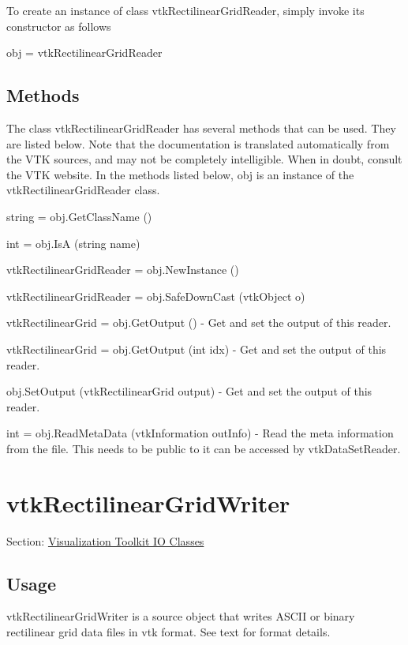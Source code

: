 To create an instance of class vtk\-Rectilinear\-Grid\-Reader, simply invoke its constructor as follows \begin{DoxyVerb}  obj = vtkRectilinearGridReader
\end{DoxyVerb}
 \hypertarget{vtkwidgets_vtkxyplotwidget_Methods}{}\subsection{Methods}\label{vtkwidgets_vtkxyplotwidget_Methods}
The class vtk\-Rectilinear\-Grid\-Reader has several methods that can be used. They are listed below. Note that the documentation is translated automatically from the V\-T\-K sources, and may not be completely intelligible. When in doubt, consult the V\-T\-K website. In the methods listed below, {\ttfamily obj} is an instance of the vtk\-Rectilinear\-Grid\-Reader class. 
\begin{DoxyItemize}
\item {\ttfamily string = obj.\-Get\-Class\-Name ()}  
\item {\ttfamily int = obj.\-Is\-A (string name)}  
\item {\ttfamily vtk\-Rectilinear\-Grid\-Reader = obj.\-New\-Instance ()}  
\item {\ttfamily vtk\-Rectilinear\-Grid\-Reader = obj.\-Safe\-Down\-Cast (vtk\-Object o)}  
\item {\ttfamily vtk\-Rectilinear\-Grid = obj.\-Get\-Output ()} -\/ Get and set the output of this reader.  
\item {\ttfamily vtk\-Rectilinear\-Grid = obj.\-Get\-Output (int idx)} -\/ Get and set the output of this reader.  
\item {\ttfamily obj.\-Set\-Output (vtk\-Rectilinear\-Grid output)} -\/ Get and set the output of this reader.  
\item {\ttfamily int = obj.\-Read\-Meta\-Data (vtk\-Information out\-Info)} -\/ Read the meta information from the file. This needs to be public to it can be accessed by vtk\-Data\-Set\-Reader.  
\end{DoxyItemize}\hypertarget{vtkio_vtkrectilineargridwriter}{}\section{vtk\-Rectilinear\-Grid\-Writer}\label{vtkio_vtkrectilineargridwriter}
Section\-: \hyperlink{sec_vtkio}{Visualization Toolkit I\-O Classes} \hypertarget{vtkwidgets_vtkxyplotwidget_Usage}{}\subsection{Usage}\label{vtkwidgets_vtkxyplotwidget_Usage}
vtk\-Rectilinear\-Grid\-Writer is a source object that writes A\-S\-C\-I\-I or binary rectilinear grid data files in vtk format. See text for format details.

